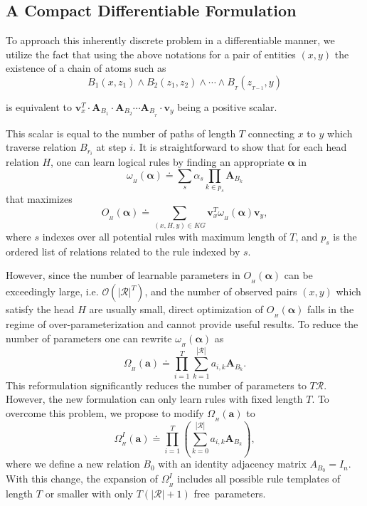 \documentclass{article}
\newcommand{\mb}[1]{\mathbf{#1}}
\begin{document}
\subsection{A Compact Differentiable Formulation}
\label{sec:compact_formulation}

To approach this inherently discrete problem in a differentiable manner, we utilize the fact that using the above notations for a pair of entities $(x,y)$ the existence of a chain of atoms such as
\begin{equation}
    B_1(x, z_1) \land B_2(z_1,z_2) \land \cdots \land     
    B_{\scriptstyle_{T}}(z_{\scriptstyle_{T-1}}, y)
\end{equation}

is equivalent to $\mb{v}_x^T \cdot  \mb{A}_{B_{1}} \cdot \mb{A}_{B_{2}} \cdots \mb{A}_{B_{\scriptstyle_{T}}} \cdot \mb{v}_y$ being a positive scalar.

This scalar is equal to the number of paths of length $T$ connecting $x$ to $y$ which traverse relation $B_{r_i}$ at step $i$. It is straightforward to show that for each head relation $H$, one can learn logical rules by finding an appropriate $\bm{\alpha}$ in
\begin{equation}
    \omega_{\scriptstyle_{H}}(\bm{\alpha})\doteq \sum_{s} \alpha_s \prod_{k \in p_s} \mb{A}_{B_k}
\end{equation}
that maximizes
\begin{equation}
    O_{\scriptstyle_{H}}(\bm{\alpha}) \doteq \sum_{(x,H,y) \in KG} \mb{v}_x^T \omega_{\scriptstyle_{H}}(\bm{\alpha}) \mb{v}_y,    
\end{equation}
where $s$ indexes over all potential rules with maximum length of $T$, and $p_s$ is the ordered list of relations related to the rule indexed by $s$.

However, since the number of learnable parameters in $O_{\scriptstyle_{H}}(\bm{\alpha})$ can be exceedingly large, i.e. $\mathcal{O}(|\mathcal{R}|^T)$, and the number of observed pairs $(x,y)$ which satisfy the head $H$ are usually small, direct optimization of $O_{\scriptstyle_{H}}(\bm{\alpha})$ falls in the regime of over-parameterization and cannot provide useful results. To reduce the number of parameters one can rewrite $\omega_{\scriptstyle_{H}}(\bm{\alpha})$ as
\begin{equation}
    \Omega_{\scriptstyle_{H}}(\mb{a}) \doteq \prod_{i=1}^T \sum_{k=1}^{|\mathcal{R}|} a_{i,k} \mb{A}_{B_k}.
\end{equation}
This reformulation significantly reduces the number of parameters to $T \mathcal{R}$.
However, the new formulation can only learn rules with fixed length $T$. To overcome this problem, we propose to modify $\Omega_{\scriptstyle_{H}}(\mb{a})$ to
\begin{equation}
    \Omega^I_{\scriptstyle_{H}}(\mb{a}) \doteq \prod_{i=1}^T (\sum_{k=0}^{|\mathcal{R}|} a_{i,k} \mb{A}_{B_k}),       
\end{equation}
where
we define a new relation $B_0$ with an identity adjacency matrix $A_{B_0} = I_n$. With this change, the expansion of $\Omega^I_{\scriptstyle_{H}}$ includes all possible rule templates of length $T$ or smaller with only $T (|\mathcal{R}|+1)$ free~parameters.
\end{document}
